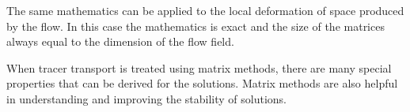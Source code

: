 \documentclass[11pt]{article}
\begin{document}
The same mathematics can be applied to the local deformation of space produced
by the flow.  In this case the mathematics is exact and the size of the matrices
always equal to the dimension of the flow field.

When tracer transport is treated using matrix methods, there
are many special properties that can be derived for the solutions.  
Matrix methods are also
helpful in understanding and improving the stability of solutions.




\end{document}

